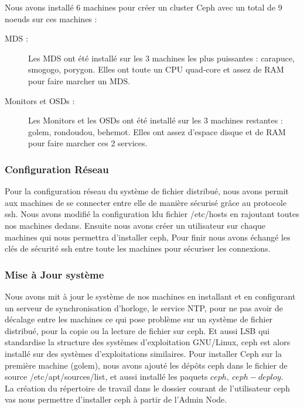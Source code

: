 \documentclass[12pt]{article}
\begin{document}
		Nous avons installé 6 machines pour créer un cluster Ceph avec un total de 9 noeuds sur ces machines :
		\begin{description}
		\item[MDS :] Les MDS ont été installé sur les 3 machines les plus puissantes : carapuce, smogogo, porygon.
		Elles ont toute un CPU quad-core et assez de RAM pour faire marcher un MDS.
		\item[Monitors et OSDs :] Les Monitors et les OSDs ont été installé sur les 3 machines restantes : golem, rondoudou, behemot.
		Elles ont assez d'espace disque et de RAM pour faire marcher ces 2 services.
		\end{description}
	\subsubsection{Configuration Réseau}
	Pour la configuration réseau du système de fichier distribué, nous avons permit aux machines de se connecter entre elle de manière sécurisé grâce au protocole ssh. Nous avons modifié la configuration ldu fichier /etc/hosts en rajoutant toutes nos machines dedans. Ensuite nous avons créer un utilisateur sur chaque machines qui nous permettra d'installer ceph, Pour finir nous avons échangé les clés de sécurité ssh entre toute les machines pour sécuriser les connexions.
	
	\subsubsection{Mise à Jour système}
	Nous avons mit à jour le système de nos machines en installant et en configurant un serveur de synchronisation d'horloge, le service NTP, pour ne pas avoir de décalage entre les machines ce qui pose problème sur un système de fichier distribué, pour la copie ou la lecture de fichier sur ceph. Et aussi LSB qui standardise la structure des systèmes d'exploitation GNU/Linux, ceph est alors installé sur des systèmes d'exploitations similaires.
	Pour installer Ceph sur la première machine (golem), nous avons ajouté les dépôts ceph dans le fichier de source /etc/apt/sources/list, et aussi installé les paquets $ceph,\ ceph-deploy$.
	\\La création du répertoire de travail dans le dossier courant de l'utilisateur ceph vas nous permettre d'installer ceph à partir de l'Admin Node.
	
\end{document}
